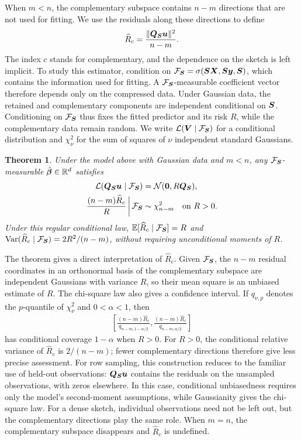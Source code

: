 \documentclass{article}
\theoremstyle{plain} %
\newtheorem{theorem}{Theorem}[section]
\theoremstyle{definition} %
\theoremstyle{definition} %
\begin{document}
When $m<n$, the complementary subspace contains $n-m$ directions that are not used for fitting. We use the residuals along these directions to define
\begin{align*}
 \widehat R_c=\frac{\lVert\boldsymbol{Q}_{\boldsymbol{S}}\boldsymbol{u}\rVert^2}{n-m}.
\end{align*}
The index $c$ stands for complementary, and the dependence on the sketch is left implicit. To study this estimator, condition on
${\mathcal F}_{\boldsymbol{S}}=\sigma(\boldsymbol{S}\boldsymbol{X},\boldsymbol{S}\boldsymbol{y},\boldsymbol{S})$, which contains the information used for fitting. A ${\mathcal F}_{\boldsymbol{S}}$-measurable coefficient vector therefore depends only on the compressed data. Under Gaussian data, the retained and complementary components are independent conditional on $\boldsymbol{S}$. Conditioning on ${\mathcal F}_{\boldsymbol{S}}$ thus fixes the fitted predictor and its risk $R$, while the complementary data remain random. We write $\mathcal L(\boldsymbol{V}\mid{\mathcal F}_{\boldsymbol{S}})$ for a conditional distribution and $\chi^2_\nu$ for the sum of squares of $\nu$ independent standard Gaussians.

\begin{theorem}
\label{thm:cpal-complementary-law}
\label{thm:complementary-validation}
Under the model above with Gaussian data and $m<n$, any
${\mathcal F}_{\boldsymbol{S}}$-measurable $\hat{\boldsymbol{\beta}}{}\in{\mathbb{R}}^d$ satisfies
\begin{align}
 \mathcal L(\boldsymbol{Q}_{\boldsymbol{S}}\boldsymbol{u}\mid{\mathcal F}_{\boldsymbol{S}})
 &={\mathcal N}(\mathbf{0},R\boldsymbol{Q}_{\boldsymbol{S}}),\notag\\
 \frac{(n-m)\widehat R_c}{R}\,\bigg|\,{\mathcal F}_{\boldsymbol{S}}
 &\sim\chi^2_{n-m}\quad\text{on }R>0.
 \label{eq:cpal-complementary-law}
\end{align}
Under this regular conditional law,
${\mathbb{E}}[\widehat R_c\mid{\mathcal F}_{\boldsymbol{S}}]=R$ and
$\operatorname{Var}(\widehat R_c\mid{\mathcal F}_{\boldsymbol{S}})=2R^2/(n-m)$,
without requiring unconditional moments of $R$.
\end{theorem}

The theorem gives a direct interpretation of $\widehat R_c$. Given ${\mathcal F}_{\boldsymbol{S}}$, the $n-m$ residual coordinates in an orthonormal basis of the complementary subspace are independent Gaussians with variance $R$, so their mean square is an unbiased estimate of $R$. The chi-square law also gives a confidence interval. If $q_{\nu,p}$ denotes the $p$-quantile of $\chi^2_\nu$ and $0<\alpha<1$, then
\begin{align}
 \left[
 \frac{(n-m)\widehat R_c}{q_{n-m,1-\alpha/2}},
 \frac{(n-m)\widehat R_c}{q_{n-m,\alpha/2}}
 \right]
 \label{eq:cpal-risk-interval}
\end{align}
has conditional coverage $1-\alpha$ when $R>0$. For $R>0$, the conditional relative variance of $\widehat R_c$ is $2/(n-m)$; fewer complementary directions therefore give less precise assessment. For row sampling, this construction reduces to the familiar use of held-out observations: $\boldsymbol{Q}_{\boldsymbol{S}}\boldsymbol{u}$ contains the residuals on the unsampled observations, with zeros elsewhere. In this case, conditional unbiasedness requires only the model's second-moment assumptions, while Gaussianity gives the chi-square law. For a dense sketch, individual observations need not be left out, but the complementary directions play the same role. When $m=n$, the complementary subspace disappears and $\widehat R_c$ is undefined.
\end{document}
